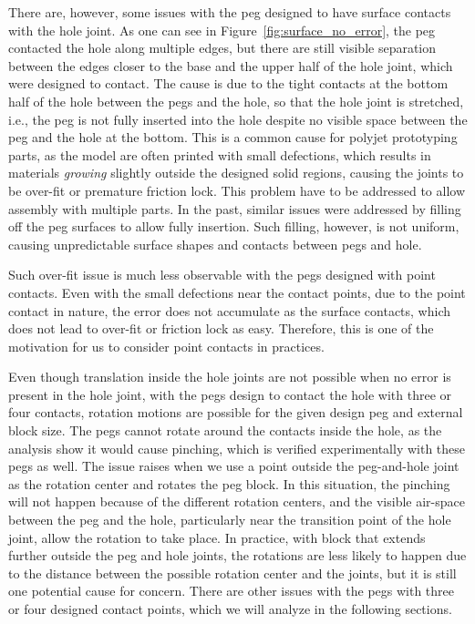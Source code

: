 \documentclass[11pt, twocolumn]{article}
\begin{document}
There are, however, some issues with the peg designed to have surface contacts with the hole joint. As one can see in Figure~\ref{fig:surface_no_error}, the peg contacted the hole along multiple edges, but there are still visible separation between the edges closer to the base and the upper half of the hole joint, which were designed to contact. The cause is due to the tight contacts at the bottom half of the hole between the pegs and the hole, so that the hole joint is stretched, i.e., the peg is not fully inserted into the hole despite no visible space between the peg and the hole at the bottom. This is a common cause for polyjet prototyping parts, as the model are often printed with small defections, which results in materials {\em growing} slightly outside the designed solid regions, causing the joints to be over-fit or premature friction lock. This problem have to be addressed to allow assembly with multiple parts. In the past, similar issues were addressed by filling off the peg surfaces to allow fully insertion. Such filling, however, is not uniform, causing unpredictable surface shapes and contacts between pegs and hole. 

Such over-fit issue is much less observable with the pegs designed with point contacts. Even with the small defections near the contact points, due to the point contact in nature, the error does not accumulate as the surface contacts, which does not lead to over-fit or friction lock as easy. Therefore, this is one of the motivation for us to consider point contacts in practices. 

Even though translation inside the hole joints are not possible when no error is present in the hole joint, with the pegs design to contact the hole with three or four contacts, rotation motions are possible for the given design peg and external block size. The pegs cannot rotate around the contacts inside the hole, as the analysis show it would cause pinching, which is verified experimentally with these pegs as well. The issue raises when we use a point outside the peg-and-hole joint as the rotation center and rotates the peg block. In this situation, the pinching will not happen because of the different rotation centers, and the visible air-space between the peg and the hole, particularly near the transition point of the hole joint, allow the rotation to take place. In practice, with block that extends further outside the peg and hole joints, the rotations are less likely to happen due to the distance between the possible rotation center and the joints, but it is still one potential cause for concern. There are other issues with the pegs with three or four designed contact points, which we will analyze in the following sections. 
\end{document}
